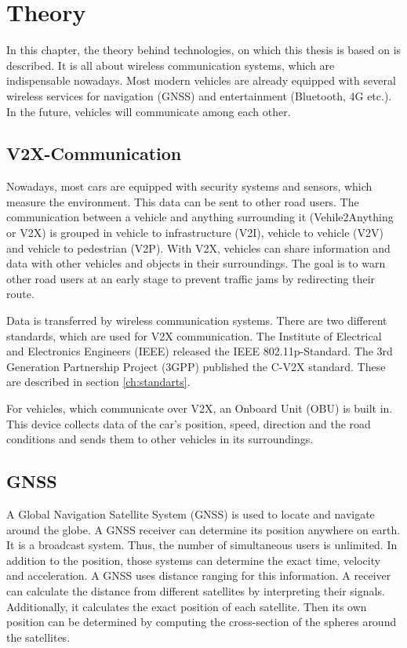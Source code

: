 \chapter{Theory}

In this chapter, the theory behind technologies, on which this thesis is based on is described. It is all about wireless communication systems, which are indispensable nowadays. Most modern vehicles are already equipped with several wireless services for navigation (GNSS) and entertainment (Bluetooth, 4G etc.). In the future, vehicles will communicate among each other. \cite{V2XFuture}

\section{V2X-Communication}\label{sec:V2X-Communication}

Nowadays, most cars are equipped with security systems and sensors, which measure the environment. This data can be sent to other road users. The communication between a vehicle and anything surrounding it (Vehile2Anything or V2X) is grouped in vehicle to infrastructure (V2I), vehicle to vehicle (V2V) and vehicle to pedestrian (V2P). With V2X, vehicles can share information and data with other vehicles and objects in their surroundings. The goal is to warn other road users at an early stage to prevent traffic jams by redirecting their route. \cite{V2XFuture}

Data is transferred by wireless communication systems. There are two different standards, which are used for V2X communication. The Institute of Electrical and Electronics Engineers (IEEE) released the IEEE 802.11p-Standard. The 3rd Generation Partnership Project (3GPP) published the C-V2X standard. These are described in section \ref{ch:standarts}.

For vehicles, which communicate over V2X, an Onboard Unit (OBU) is built in. This device collects data of the car's position, speed, direction and the road conditions and sends them to other vehicles in its surroundings. \cite{Mustafa}

\section{GNSS}

A Global Navigation Satellite System (GNSS) is used to locate and navigate around the globe. A GNSS receiver can determine its position anywhere on earth. It is a broadcast system. Thus, the number of simultaneous users is unlimited. In addition to the position, those systems can determine the exact time, velocity and acceleration. A GNSS uses distance ranging for this information. A receiver can calculate the distance from different satellites by interpreting their signals. Additionally, it calculates the exact position of each satellite. Then its own position can be determined by computing the cross-section of the spheres around the satellites. \cite{WsCommScript}

